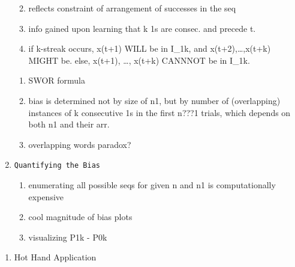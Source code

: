 \documentclass[12pt,twoside]{dukestatscithesis}
\providecommand{\tightlist}{%
  \setlength{\itemsep}{0pt}\setlength{\parskip}{0pt}}
\theoremstyle{definition}
\theoremstyle{definition}
\theoremstyle{definition}
\theoremstyle{remark}
\begin{document}
\begin{enumerate}
\begin{enumerate}
\begin{verbatim}
\end{verbatim}
  \item
    reflects constraint of arrangement of successes in the seq
  \item
    info gained upon learning that k 1s are consec. and precede t.
  \item
    if k-streak occurs, x(t+1) WILL be in I\_1k, and
    x(t+2),\ldots{},x(t+k) MIGHT be. else, x(t+1), \ldots{}, x(t+k)
    CANNNOT be in I\_1k.
  \end{enumerate}
  \begin{enumerate}
  \def\labelenumii{\alph{enumii}.}
  \setcounter{enumii}{4}
  \tightlist
  \item
    SWOR formula
  \item
    bias is determined not by size of n1, but by number of (overlapping)
    instances of k consecutive 1s in the first n???1 trials, which
    depends on both n1 and their arr.
  \item
    overlapping words paradox?
  \end{enumerate}
\item
\begin{verbatim}
Quantifying the Bias
\end{verbatim}
  \begin{enumerate}
  \def\labelenumii{\alph{enumii}.}
  \tightlist
  \item
    enumerating all possible seqs for given n and n1 is computationally
    expensive
  \item
    cool magnitude of bias plots
  \item
    visualizing P1k - P0k
  \end{enumerate}
\end{enumerate}
\begin{enumerate}
\def\labelenumi{\Alph{enumi}.}
\setcounter{enumi}{2}
\tightlist
\item
  Hot Hand Application
\end{enumerate}
\end{document}
